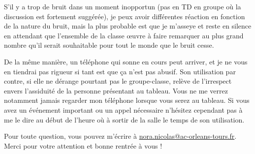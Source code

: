 \documentclass[a4paper, 10pt, final, garamond]{book}
\begin{document}
S'il y a trop de bruit dans un moment inopportun (pas en TD en groupe où la
discussion est fortement suggérée), je peux avoir différentes réaction en
fonction de la nature du bruit, mais la plus probable est que je m'asseye et
reste en silence en attendant que l'ensemble de la classe œuvre à faire
remarquer au plus grand nombre qu'il serait souhaitable pour tout le monde que
le bruit cesse.

De la même manière, un téléphone qui sonne en cours peut arriver, et je ne vous
en tiendrai pas rigueur si tant est que ça n'est pas abusif. Son utilisation par
contre, si elle ne dérange pourtant pas le groupe-classe, relève de l'irrespect
envers l'assiduité de la personne présentant au tableau. Vous ne me verrez
notamment jamais regarder mon téléphone lorsque vous serez au tableau. Si vous
avez un événement important ou un appel nécessaire n'hésitez cependant pas à me
le dire au début de l'heure où à sortir de la salle le temps de son utilisation.

\vfill

Pour toute question, vous pouvez m'écrire à
\href{nora.nicolas@ac-orleans-tours.fr}{nora.nicolas@ac-orleans-tours.fr}. Merci
pour votre attention et bonne rentrée à vous !

\vfill
\end{document}
